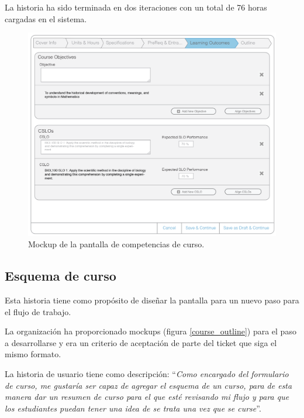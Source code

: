 La historia ha sido terminada en dos iteraciones con un total de 76 horas cargadas en el sistema.

\begin{figure}[H]
\centering
\includegraphics[scale=0.3]{Capitulos/DesarrollodelaAplicacion/Imagenes/course_learning_outcomes}
\caption{Mockup de la pantalla de competencias de curso.}
  \label{course_learning_outcomes}
\end{figure}

\subsection{Esquema de curso}
Esta historia tiene como propósito de diseñar la pantalla para un nuevo paso para el flujo de trabajo. 

La organización ha proporcionado mockups (figura \ref{course_outline}) para el paso a desarrollarse y era un criterio de aceptación de parte del ticket que siga el mismo formato.

La historia de usuario tiene como descripción: \enquote{\textit{Como encargado del formulario de curso, me gustaría ser capaz de agregar el esquema de un curso, para de esta manera dar un resumen de curso para el que esté revisando mi flujo y para que los estudiantes puedan tener una idea de se trata una vez que se curse}}.


